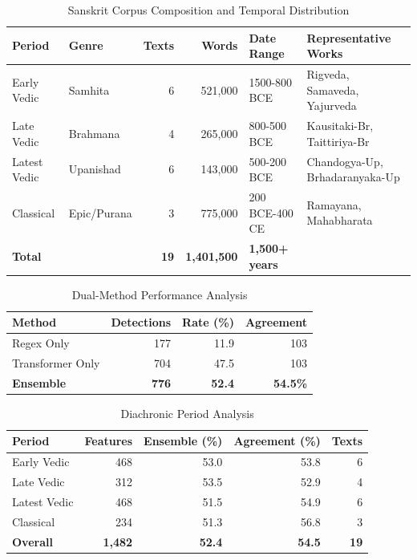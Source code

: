 
\begin{table}[t]
\centering
\caption{Sanskrit Corpus Composition and Temporal Distribution}
\label{tab:corpus}
\begin{tabular}{llrrll}
\toprule
\textbf{Period} & \textbf{Genre} & \textbf{Texts} & \textbf{Words} & \textbf{Date Range} & \textbf{Representative Works} \\
\midrule
Early Vedic & Samhita & 6 & 521,000 & 1500-800 BCE & Rigveda, Samaveda, Yajurveda \\
Late Vedic & Brahmana & 4 & 265,000 & 800-500 BCE & Kausitaki-Br, Taittiriya-Br \\
Latest Vedic & Upanishad & 6 & 143,000 & 500-200 BCE & Chandogya-Up, Brhadaranyaka-Up \\
Classical & Epic/Purana & 3 & 775,000 & 200 BCE-400 CE & Ramayana, Mahabharata \\
\midrule
\textbf{Total} & & \textbf{19} & \textbf{1,401,500} & \textbf{1,500+ years} & \\
\bottomrule
\end{tabular}
\end{table}

\begin{table}[h]
\centering
\caption{Dual-Method Performance Analysis}
\label{tab:methods}
\begin{tabular}{lrrr}
\toprule
\textbf{Method} & \textbf{Detections} & \textbf{Rate (\%)} & \textbf{Agreement} \\
\midrule
Regex Only & 177 & 11.9 & 103 \\
Transformer Only & 704 & 47.5 & 103 \\
\textbf{Ensemble} & \textbf{776} & \textbf{52.4} & \textbf{54.5\%} \\
\bottomrule
\end{tabular}
\end{table}

\begin{table}[h]
\centering
\caption{Diachronic Period Analysis}
\label{tab:periods}
\begin{tabular}{lrrrr}
\toprule
\textbf{Period} & \textbf{Features} & \textbf{Ensemble (\%)} & \textbf{Agreement (\%)} & \textbf{Texts} \\
\midrule
Early Vedic & 468 & 53.0 & 53.8 & 6 \\
Late Vedic & 312 & 53.5 & 52.9 & 4 \\
Latest Vedic & 468 & 51.5 & 54.9 & 6 \\
Classical & 234 & 51.3 & 56.8 & 3 \\
\midrule
\textbf{Overall} & \textbf{1,482} & \textbf{52.4} & \textbf{54.5} & \textbf{19} \\
\bottomrule
\end{tabular}
\end{table}

